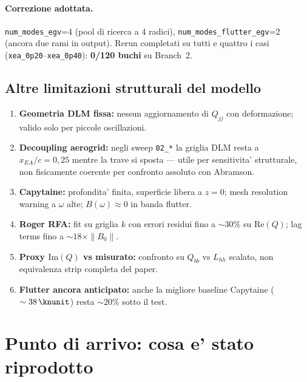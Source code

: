 \documentclass[11pt,a4paper]{article}
\begin{document}
\paragraph{Correzione adottata.}
\texttt{num\_modes\_egv}=4 (pool di ricerca a 4 radici), \texttt{num\_modes\_flutter\_egv}=2
(ancora due rami in output). Rerun completati su tutti e quattro i casi
(\texttt{xea\_0p20}--\texttt{xea\_0p40}): \textbf{0/120 buchi} su Branch~2.

\subsection{Altre limitazioni strutturali del modello}

\begin{enumerate}
  \item \textbf{Geometria DLM fissa:} nessun aggiornamento di $Q_{jj}$ con deformazione;
        valido solo per piccole oscillazioni.
  \item \textbf{Decoupling aerogrid:} negli sweep \texttt{02\_*} la griglia DLM resta a
        $x_{EA}/c=0{,}25$ mentre la trave si sposta --- utile per sensitivita' strutturale,
        non fisicamente coerente per confronto assoluto con Abramson.
  \item \textbf{Capytaine:} profondita' finita, superficie libera a $z=0$; mesh resolution
        warning a $\omega$ alte; $B(\omega)\approx 0$ in banda flutter.
  \item \textbf{Roger RFA:} fit su griglia $k$ con errori residui fino a $\sim 30\%$ su
        $\mathrm{Re}(Q)$; lag terms fino a $\sim 18\times \|B_0\|$.
  \item \textbf{Proxy $\mathrm{Im}(Q)$ vs misurato:} confronto su $Q_{bb}$ vs $L_{hh}$ scalato,
        non equivalenza strip completa del paper.
  \item \textbf{Flutter ancora anticipato:} anche la migliore baseline Capytaine
        ($\sim\SI{38}{\knunit}$) resta $\sim 20\%$ sotto il test.
\end{enumerate}

\section{Punto di arrivo: cosa e' stato riprodotto}
\end{document}
